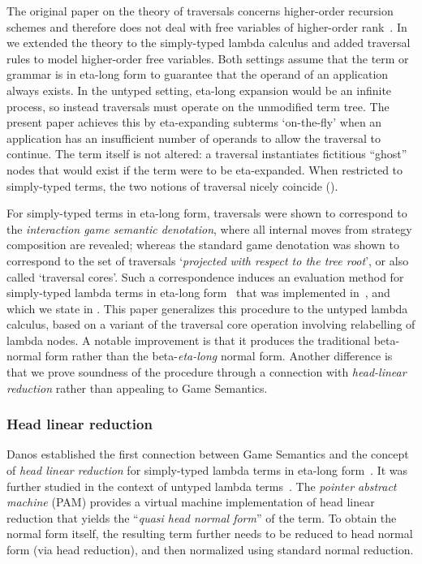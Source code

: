 \documentclass[xchauthor,chkrefs,GCNS,amsmath,amsthm,rotating,leaveRGB]{tcsg}
\theoremstyle{plain}
\theoremstyle{definition}
\begin{document}
The original paper on the theory of traversals concerns higher-order
recursion schemes and therefore does not deal with free variables of
higher-order rank~\cite{OngLics2006}. In~\cite{BlumPhd} we extended the
theory to the simply-typed lambda calculus and added traversal rules to model
higher-order free variables. Both settings assume that the term or grammar is
in eta-long form to guarantee that the operand of an application always
exists. In the untyped setting, eta-long expansion would be an infinite
process, so instead traversals must operate on the unmodified term tree. The
present paper achieves this by eta-expanding subterms `on-the-fly' when an application has an insufficient number of operands to allow the traversal to continue.
The term itself is not altered: a traversal instantiates fictitious
``ghost'' nodes that would exist if the term were to be eta-expanded. When
restricted to simply-typed terms, the two notions of traversal nicely
coincide ().

For simply-typed terms in eta-long form, traversals were shown to correspond
to the \emph{interaction game semantic denotation}, where all internal moves
from strategy composition are revealed; whereas the standard game denotation
was shown to correspond to the set of traversals `\emph{projected with
respect to the tree root}', or also called `traversal cores'. Such a
correspondence induces an evaluation method for simply-typed lambda terms in
eta-long form~\cite{BlumPhd,BlumGalop2008,Ong-NormByTrav2015} that was
implemented in~\cite{Blum-HogTool}, and which we state in
. This paper
generalizes this procedure to the untyped lambda calculus, based on a variant
of the traversal core operation involving relabelling of lambda nodes. A
notable improvement is that it produces the traditional beta-normal form
rather than the beta-\emph{eta-long} normal form. Another difference is that
we prove soundness of the procedure through a connection with
\emph{head-linear reduction} rather than appealing to Game Semantics.

\subsubsection{Head linear reduction}\label{sec1.3.2}

Danos  established the first connection between
Game Semantics and the concept of \emph{head linear reduction} for
simply-typed lambda terms in eta-long form~\cite{danosherbelinregnier1996}.
It was further studied in the context of untyped lambda
terms~\cite{danos-head}. The \emph{pointer abstract machine} (PAM) provides a
virtual machine implementation of head linear reduction that yields the
``\emph{quasi head normal form}'' of the term. To obtain the normal form
itself, the resulting term further needs to be reduced to head normal form
(via head reduction), and then normalized using standard normal reduction.
\end{document}
